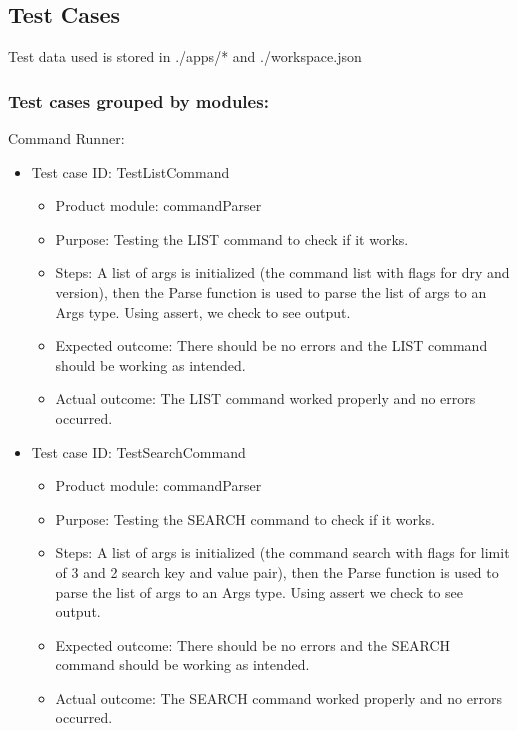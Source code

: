 \documentclass[11pt]{article}
\begin{document}
\subsection{Test Cases}
Test data used is stored in ./apps/* and ./workspace.json

\subsubsection{Test cases grouped by modules:}
Command Runner:
\begin{itemize}
    \item Test case ID: TestListCommand
    \begin{itemize}
        \item Product module: commandParser
        \item Purpose: Testing the LIST command to check if it works.
        \item Steps: A list of args is initialized (the command list with flags for dry and version), then the Parse function is used to parse the list of args to an Args type. Using assert, we check to see output.
        \item Expected outcome: There should be no errors and the LIST command should be working as intended.
        \item Actual outcome: The LIST command worked properly and no errors occurred.
    \end{itemize}
\end{itemize}

\begin{itemize}
    \item Test case ID: TestSearchCommand
    \begin{itemize}
        \item Product module: commandParser
        \item Purpose: Testing the SEARCH command to check if it works.
        \item Steps: A list of args is initialized (the command search with flags for limit of 3 and 2 search key and value pair), then the Parse function is used to parse the list of args to an Args type. Using assert we check to see output.
        \item Expected outcome: There should be no errors and the SEARCH command should be working as intended.
        \item Actual outcome: The SEARCH command worked properly and no errors occurred.
    \end{itemize}
\end{itemize}
\end{document}
